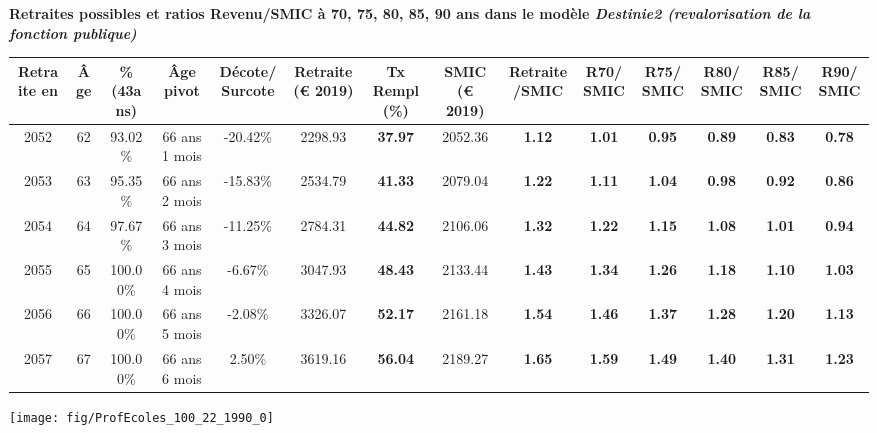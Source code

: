  \vspace{0.1cm} 
{\bf \noindent Retraites possibles et ratios Revenu/SMIC à 70, 75, 80, 85, 90 ans dans le modèle \emph{Destinie2 (revalorisation de la fonction publique)}}  
 
\begin{adjustbox}{max width=\textwidth} 
\begin{tabular}[htb]{|c|c||c|c|c||c|c||c|c||c|c|c|c|c|} 
\hline 
 Retraite en &  Âge &  \%(43ans) &  Âge pivot &  Décote/Surcote &  Retraite (\euro{} 2019) &  Tx Rempl(\%) &  SMIC (\euro{} 2019) &  Retraite/SMIC &  R70/SMIC &  R75/SMIC &  R80/SMIC &  R85/SMIC &  R90/SMIC \\ 
\hline \hline 
 2052 &  62 &  93.02\% &  66 ans 1 mois &  -20.42\% &  2298.93 &  {\bf 37.97} &  2052.36 &  {\bf 1.12} &  {\bf 1.01} &  {\bf {\color{red} 0.95}} &  {\bf {\color{red} 0.89}} &  {\bf {\color{red} 0.83}} &  {\bf {\color{red} 0.78}} \\ 
\hline 
 2053 &  63 &  95.35\% &  66 ans 2 mois &  -15.83\% &  2534.79 &  {\bf 41.33} &  2079.04 &  {\bf 1.22} &  {\bf 1.11} &  {\bf 1.04} &  {\bf {\color{red} 0.98}} &  {\bf {\color{red} 0.92}} &  {\bf {\color{red} 0.86}} \\ 
\hline 
 2054 &  64 &  97.67\% &  66 ans 3 mois &  -11.25\% &  2784.31 &  {\bf 44.82} &  2106.06 &  {\bf 1.32} &  {\bf 1.22} &  {\bf 1.15} &  {\bf 1.08} &  {\bf 1.01} &  {\bf {\color{red} 0.94}} \\ 
\hline 
 2055 &  65 &  100.00\% &  66 ans 4 mois &  -6.67\% &  3047.93 &  {\bf 48.43} &  2133.44 &  {\bf 1.43} &  {\bf 1.34} &  {\bf 1.26} &  {\bf 1.18} &  {\bf 1.10} &  {\bf 1.03} \\ 
\hline 
 2056 &  66 &  100.00\% &  66 ans 5 mois &  -2.08\% &  3326.07 &  {\bf 52.17} &  2161.18 &  {\bf 1.54} &  {\bf 1.46} &  {\bf 1.37} &  {\bf 1.28} &  {\bf 1.20} &  {\bf 1.13} \\ 
\hline 
 2057 &  67 &  100.00\% &  66 ans 6 mois &  2.50\% &  3619.16 &  {\bf 56.04} &  2189.27 &  {\bf 1.65} &  {\bf 1.59} &  {\bf 1.49} &  {\bf 1.40} &  {\bf 1.31} &  {\bf 1.23} \\ 
\hline 
\hline 
\end{tabular} 
\end{adjustbox} 
 
 \vspace{0.1cm} 

 {\hspace{-2.2cm}\texttt{[image: fig/ProfEcoles\_100\_22\_1990\_0]}} 

\newpage 
 
